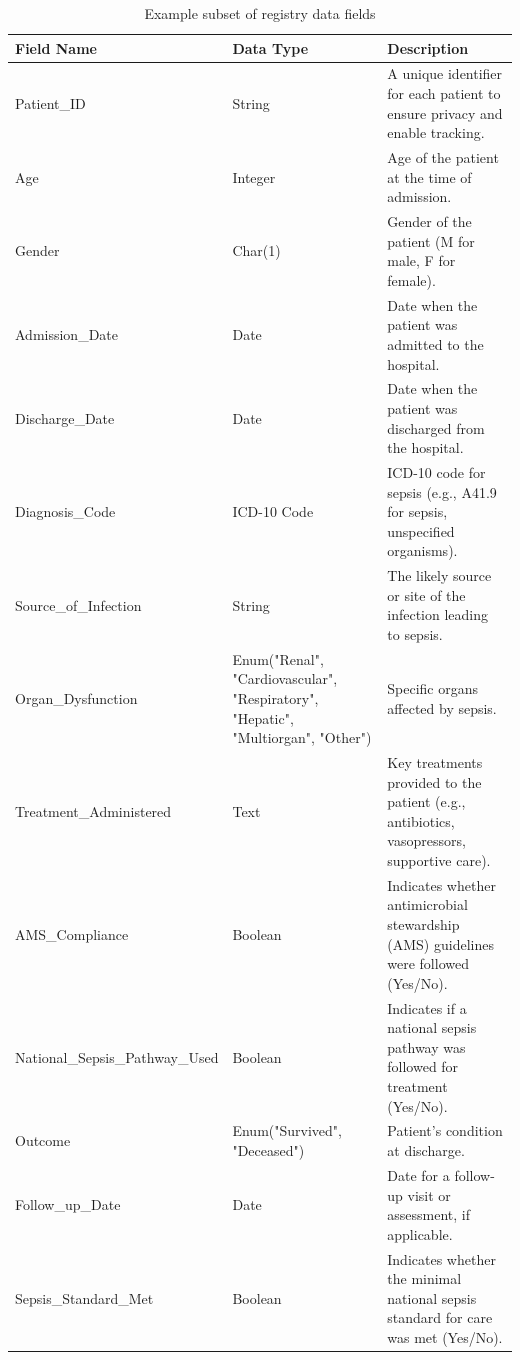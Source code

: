 \begin{table}[h]
        \caption{Example subset of registry data fields} 
    \centering
    \begin{tabular}{|l|>{\raggedright\arraybackslash}p{3cm}|>{\raggedright\arraybackslash}p{6cm}|}
        \hline
        \textbf{Field Name} & \textbf{Data Type} & \textbf{Description} \\
        \hline
        Patient\_ID & String & A unique identifier for each patient to ensure privacy and enable tracking. \\
        \hline
        Age & Integer & Age of the patient at the time of admission. \\
        \hline
        Gender & Char(1) & Gender of the patient (M for male, F for female). \\
        \hline
        Admission\_Date & Date & Date when the patient was admitted to the hospital. \\
        \hline
        Discharge\_Date & Date & Date when the patient was discharged from the hospital. \\
        \hline
        Diagnosis\_Code & ICD-10 Code & ICD-10 code for sepsis (e.g., A41.9 for sepsis, unspecified organisms). \\
        \hline
        Source\_of\_Infection & String & The likely source or site of the infection leading to sepsis. \\
        \hline
        Organ\_Dysfunction & Enum("Renal", "Cardiovascular", "Respiratory", "Hepatic", "Multiorgan", "Other") & Specific organs affected by sepsis. \\
        \hline
        Treatment\_Administered & Text & Key treatments provided to the patient (e.g., antibiotics, vasopressors, supportive care). \\
        \hline
        AMS\_Compliance & Boolean & Indicates whether antimicrobial stewardship (AMS) guidelines were followed (Yes/No). \\
        \hline
        National\_Sepsis\_Pathway\_Used & Boolean & Indicates if a national sepsis pathway was followed for treatment (Yes/No). \\
        \hline
        Outcome & Enum("Survived", "Deceased") & Patient's condition at discharge. \\
        \hline
        Follow\_up\_Date & Date & Date for a follow-up visit or assessment, if applicable. \\
        \hline
        Sepsis\_Standard\_Met & Boolean & Indicates whether the minimal national sepsis standard for care was met (Yes/No). \\
        \hline
    \end{tabular}
    \label{tab:national_registry_example}
 
\end{table}




